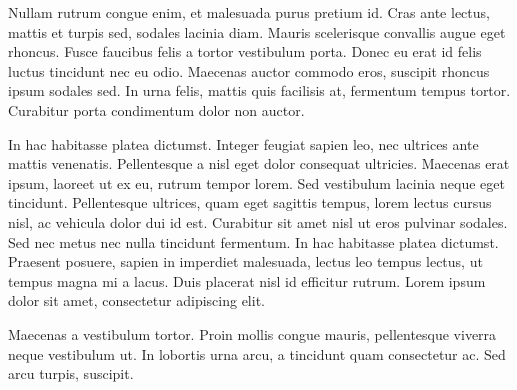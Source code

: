 \documentclass[a4paper, 12pt]{article}
\begin{document}
Nullam rutrum congue enim, et malesuada purus pretium id. Cras ante lectus, mattis et turpis sed, sodales lacinia diam. Mauris scelerisque convallis augue eget rhoncus. Fusce faucibus felis a tortor vestibulum porta. Donec eu erat id felis luctus tincidunt nec eu odio. Maecenas auctor commodo eros, suscipit rhoncus ipsum sodales sed. In urna felis, mattis quis facilisis at, fermentum tempus tortor. Curabitur porta condimentum dolor non auctor.

In hac habitasse platea dictumst. Integer feugiat sapien leo, nec ultrices ante mattis venenatis. Pellentesque a nisl eget dolor consequat ultricies. Maecenas erat ipsum, laoreet ut ex eu, rutrum tempor lorem. Sed vestibulum lacinia neque eget tincidunt. Pellentesque ultrices, quam eget sagittis tempus, lorem lectus cursus nisl, ac vehicula dolor dui id est. Curabitur sit amet nisl ut eros pulvinar sodales. Sed nec metus nec nulla tincidunt fermentum. In hac habitasse platea dictumst. Praesent posuere, sapien in imperdiet malesuada, lectus leo tempus lectus, ut tempus magna mi a lacus. Duis placerat nisl id efficitur rutrum. Lorem ipsum dolor sit amet, consectetur adipiscing elit.

Maecenas a vestibulum tortor. Proin mollis congue mauris, pellentesque viverra neque vestibulum ut. In lobortis urna arcu, a tincidunt quam consectetur ac. Sed arcu turpis, suscipit.

\printbibliography
\end{document}
